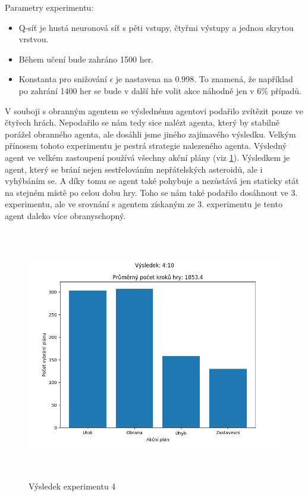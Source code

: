 Parametry experimentu:
\begin{itemize}    
    \item Q-síť je hustá neuronová síť s pěti vstupy, čtyřmi výstupy a jednou skrytou vrstvou. 
    \item Během učení bude zahráno 1500 her.
    \item Konstanta pro snižování $\epsilon$ je nastavena na 0.998. To znamená, že například po zahrání 1400 her se bude v další hře volit akce náhodně jen v 6\% případů. 
\end{itemize}

\par
V souboji s obranným agentem se výslednému agentovi podařilo zvítězit pouze ve čtyřech hrách. 
Nepodařilo se nám tedy sice nalézt agenta, který by stabilně porážel obranného agenta, ale dosáhli jsme jiného zajímavého výsledku.
Velkým přínosem tohoto experimentu je pestrá strategie nalezeného agenta. Výsledný agent ve velkém zastoupení používá všechny akční plány (viz \ref{Výsledek experimentu 04}). 
Výsledkem je agent, který se brání nejen sestřelováním nepřátelských asteroidů, ale i vyhýbáním se. A díky tomu se agent také pohybuje a nezůstává jen staticky stát na stejném místě po celou dobu hry.
Toho se nám také podařilo dosáhnout ve 3. experimentu, ale ve srovnání s agentem získaným ze 3. experimentu je tento agent daleko více obranyschopný.




\begin{figure}[p]\centering
\includegraphics[width=145mm, height=110mm]{./Obrazky/Experiment04Results.png}
\caption{Výsledek experimentu 4}
\label{Výsledek experimentu 04}
\end{figure}



